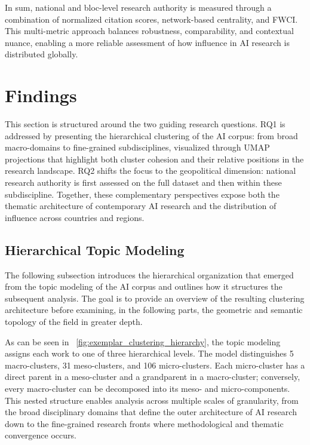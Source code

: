 \documentclass{article}
\begin{document}
In sum, national and bloc-level research authority is measured through a combination of normalized citation scores, network-based centrality, and FWCI. This multi-metric approach balances robustness, comparability, and contextual nuance, enabling a more reliable assessment of how influence in AI research is distributed globally.


\section{Findings}
\label{sec:findings}
This section is structured around the two guiding research questions. RQ1 is addressed by presenting the hierarchical clustering of the AI corpus: from broad macro-domains to fine-grained subdisciplines, visualized through UMAP projections that highlight both cluster cohesion and their relative positions in the research landscape. RQ2 shifts the focus to the geopolitical dimension: national research authority is first assessed on the full dataset and then within these subdiscipline. Together, these complementary perspectives expose both the thematic architecture of contemporary AI research and the distribution of influence across countries and regions.

\subsection{Hierarchical Topic Modeling}
\label{sec:results_topic_modeling}

The following subsection introduces the hierarchical organization that emerged from the topic modeling of the AI corpus and outlines how it structures the subsequent analysis. The goal is to provide an overview of the resulting clustering architecture before examining, in the following parts, the geometric and semantic topology of the field in greater depth.

As can be seen in \figurename~\ref{fig:exemplar_clustering_hierarchy}, the topic modeling assigns each work to one of three hierarchical levels. The model distinguishes 5 macro-clusters, 31 meso-clusters, and 106 micro-clusters. Each micro-cluster has a direct parent in a meso-cluster and a grandparent in a macro-cluster; conversely, every macro-cluster can be decomposed into its meso- and micro-components. This nested structure enables analysis across multiple scales of granularity, from the broad disciplinary domains that define the outer architecture of AI research down to the fine-grained research fronts where methodological and thematic convergence occurs.
\end{document}
